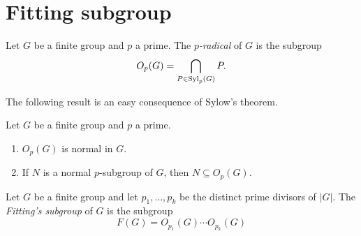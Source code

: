 

\section{Fitting subgroup}

\begin{definition}
	Let $G$ be a finite group and $p$ a prime. The
	{\em $p$-radical} of $G$ is the subgroup
	\[
		O_p(G)=\bigcap_{P\in\mathrm{Syl}_p(G)}P.
	\]
\end{definition}

The following result is an easy consequence of Sylow's theorem.  
\begin{lemma}
	\label{lemma:core:Op(G)}
	Let $G$ be a finite group and $p$ a prime. 
	\begin{enumerate}
		\item $O_p(G)$ is normal in $G$.
		\item If $N$ is a normal $p$-subgroup of $G$, then $N\subseteq O_p(G)$.
	\end{enumerate}
\end{lemma}

%

\begin{definition}
	Let $G$ be a finite group and let $p_1,\dots,p_k$ be the distinct prime divisors of	$|G|$.  
	The {\em Fitting's subgroup} of $G$ is the subgroup
	\[
		F(G)=O_{p_1}(G)\cdots O_{p_k}(G)
	\]
\end{definition}

